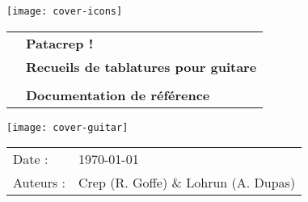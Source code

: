 \begin{titlepage}

  \texttt{[image: cover-icons]}
  \vspace{2cm}

  \begin{tabular}{l l}
    \hspace{2cm} & \textbf{\Huge Patacrep !}\\
    & \textbf{\Large Recueils de tablatures pour guitare}\\
    & \\
    & \textbf{\large Documentation de référence}\\
  \end{tabular}

  \hspace{-2cm}\texttt{[image: cover-guitar]}

  \begin{flushright}
    \begin{tabular}{l l}
      Date : & \today \\
      Auteurs : &  Crep (R. Goffe) \& Lohrun (A. Dupas) \\
    \end{tabular}
  \end{flushright}

\end{titlepage}
